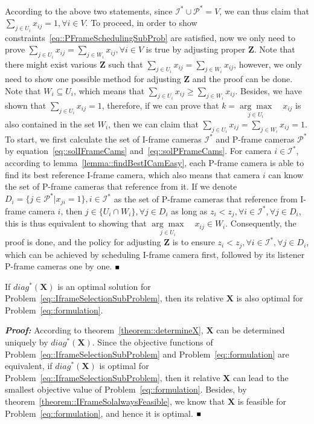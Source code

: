 According to the above two statements, since $\mathcal{I}^* \cup \mathcal{P}^* = V$, we can thus claim that ${\underset{j \in U_i}{\sum} x_{ij}=1},{\forall i \in V}$.
To proceed, in order to show constraints~\eqref{eq::PFrameSchedulingSubProb} are satisfied, now we only need to prove ${\underset{j \in U_i}{\sum} x_{ij} = \underset{j \in W_i}{\sum} x_{ij}},{\forall i \in V}$ is true by adjusting proper $\mathbf{Z}$.
Note that there might exist various $\mathbf{Z}$ such that ${\underset{j \in U_i}{\sum} x_{ij} = \underset{j \in W_i}{\sum} x_{ij}}$, however, we only need to show one possible method for adjusting $\mathbf{Z}$ and the proof can be done.
Note that $W_i \subseteq U_i$, which means that ${\underset{j \in U_i}{\sum} x_{ij} \geq \underset{j \in W_i}{\sum} x_{ij}}$.
Besides, we have shown that ${\underset{j \in U_i}{\sum} x_{ij}=1}$, therefore, if we can prove that ${k = \underset{j \in U_i}{\arg \max} \quad x_{ij}}$ is also contained in the set $W_i$, then we can claim that ${\underset{j \in U_i}{\sum} x_{ij} = \underset{j \in W_i}{\sum} x_{ij} = 1}$.
To start, we first calculate the set of I-frame cameras $\mathcal{I}^*$ and P-frame cameras $\mathcal{P}^*$ by equation~\eqref{eq::solIFrameCams} and~\eqref{eq::solPFrameCams}.
For camera $i \in \mathcal{I}^*$, according to lemma~\ref{lemma::findBestICamEasy}, each P-frame camera is able to find its best reference I-frame camera, which also means that camera $i$ can know the set of P-frame cameras that reference from it.
If we denote ${D_i= \{j \in \mathcal{P}^*|x_{ji} = 1\}},{i \in \mathcal{I}^*}$ as the set of P-frame cameras that reference from I-frame camera $i$, then ${j \in \{U_i \cap W_i\}},{\forall j \in D_i}$ as long as ${z_i < z_j}, {\forall i \in \mathcal{I}^*},{\forall j \in D_i}$, this is thus equivalent to showing that ${\underset{j \in U_i}{\arg \max} \quad x_{ij} \in W_i}$.
Consequently, the proof is done, and the policy for adjusting $\mathbf{Z}$ is to ensure ${z_i < z_j}, {\forall i \in \mathcal{I}^*},{\forall j \in D_i}$, which can be achieved by scheduling I-frame camera first, followed by its listener P-frame cameras one by one.
\hfill$\mathsmaller{\mathsmaller{\blacksquare}}$
%
\begin{mythm}
If $diag^*(\mathbf{X})$ is an optimal solution for Problem~\eqref{eq::IframeSelectionSubProblem}, then its relative $\mathbf{X}$ is also optimal for Problem~\eqref{eq::formulation}.
\label{theorem::optimalIsOptimal}
\end{mythm}
\textbf{\emph{Proof:}}
According to theorem~\ref{theorem::determineX}, $\mathbf{X}$ can be determined uniquely by $diag^*(\mathbf{X})$.
Since the objective functions of Problem~\eqref{eq::IframeSelectionSubProblem} and Problem~\eqref{eq::formulation} are equivalent, if $diag^*(\mathbf{X})$ is optimal for Problem~\eqref{eq::IframeSelectionSubProblem}, then it relative $\mathbf{X}$ can lead to the smallest objective value of Problem~\eqref{eq::formulation}.
Besides, by theorem~\ref{theorem::IFrameSolalwaysFeasible}, we know that $\mathbf{X}$ is feasible for Problem~\eqref{eq::formulation}, and hence it is optimal.
\hfill$\mathsmaller{\mathsmaller{\blacksquare}}$

